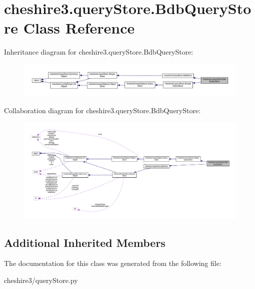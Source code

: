 \hypertarget{classcheshire3_1_1query_store_1_1_bdb_query_store}{\section{cheshire3.\-query\-Store.\-Bdb\-Query\-Store Class Reference}
\label{classcheshire3_1_1query_store_1_1_bdb_query_store}
}


Inheritance diagram for cheshire3.\-query\-Store.\-Bdb\-Query\-Store\-:
\nopagebreak
\begin{figure}[H]
\begin{center}
\leavevmode
\includegraphics[width=350pt]{classcheshire3_1_1query_store_1_1_bdb_query_store__inherit__graph}
\end{center}
\end{figure}


Collaboration diagram for cheshire3.\-query\-Store.\-Bdb\-Query\-Store\-:
\nopagebreak
\begin{figure}[H]
\begin{center}
\leavevmode
\includegraphics[width=350pt]{classcheshire3_1_1query_store_1_1_bdb_query_store__coll__graph}
\end{center}
\end{figure}
\subsection*{Additional Inherited Members}


The documentation for this class was generated from the following file\-:\begin{DoxyCompactItemize}
\item 
cheshire3/query\-Store.\-py\end{DoxyCompactItemize}
